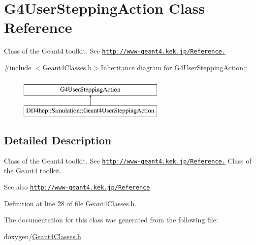 \hypertarget{class_g4_user_stepping_action}{
\section{G4UserSteppingAction Class Reference}
\label{class_g4_user_stepping_action}
}


Class of the Geant4 toolkit. See \href{http://www-geant4.kek.jp/Reference.}{\tt http://www-\/geant4.kek.jp/Reference.}  


{\ttfamily \#include $<$Geant4Classes.h$>$}Inheritance diagram for G4UserSteppingAction::\begin{figure}[H]
\begin{center}
\leavevmode
\includegraphics[height=2cm]{class_g4_user_stepping_action}
\end{center}
\end{figure}


\subsection{Detailed Description}
Class of the Geant4 toolkit. See \href{http://www-geant4.kek.jp/Reference.}{\tt http://www-\/geant4.kek.jp/Reference.} Class of the Geant4 toolkit. \begin{DoxySeeAlso}{See also}
\href{http://www-geant4.kek.jp/Reference}{\tt http://www-\/geant4.kek.jp/Reference} 
\end{DoxySeeAlso}


Definition at line 28 of file Geant4Classes.h.

The documentation for this class was generated from the following file:\begin{DoxyCompactItemize}
\item 
doxygen/\hyperlink{_geant4_classes_8h}{Geant4Classes.h}\end{DoxyCompactItemize}
